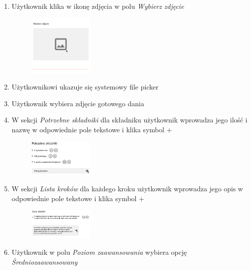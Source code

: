 \documentclass{article}
\begin{document}
\begin{enumerate}
    \item Użytkownik klika w ikonę zdjęcia w polu \textit{Wybierz zdjęcie}
        \begin{figure}[H]
            \begin{center}
                \includegraphics[width=0.3\textwidth]{images/add_recipe_step5}
            \end{center}
        \end{figure}
    \item Użytkownikowi ukazuje się systemowy file picker
    \item Użytkownik wybiera zdjęcie gotowego dania
    \item W sekcji \textit {Potrzebne składniki} dla składniku użytkownik wprowadza jego ilość i nazwę w odpowiednie pole tekstowe i klika symbol +
        \begin{figure}[H]
            \begin{center}
                \includegraphics[width=0.3\textwidth]{images/add_recipe_step6}
            \end{center}
        \end{figure}
    \item W sekcji \textit{Lista kroków} dla każdego kroku użytkownik wprowadza jego opis w odpowiednie pole tekstowe i klika symbol +
        \begin{figure}[H]
            \begin{center}
                \includegraphics[width=0.3\textwidth]{images/add_recipe_step7}
            \end{center}
        \end{figure}
    \item Użytkownik w polu \textit{Poziom zaawansowania} wybiera opcję \textit{Średniozaawansowany}

\end{enumerate}
\end{document}
